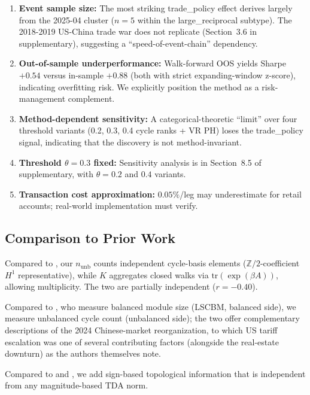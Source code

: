 \documentclass[11pt]{article}
\begin{document}
\begin{enumerate}
  \item \textbf{Event sample size:} The most striking trade\_policy effect
        derives largely from the 2025-04 cluster ($n = 5$ within the
        large\_reciprocal subtype). The 2018-2019 US-China trade war does not
        replicate (Section~3.6 in supplementary), suggesting a ``speed-of-event-chain''
        dependency.
  \item \textbf{Out-of-sample underperformance:} Walk-forward OOS yields Sharpe
        $+0.54$ versus in-sample $+0.88$ (both with strict expanding-window
        z-score), indicating overfitting risk. We explicitly position the
        method as a risk-management complement.
  \item \textbf{Method-dependent sensitivity:} A categorical-theoretic
        ``limit'' over four threshold variants (0.2, 0.3, 0.4 cycle ranks +
        VR PH) loses the trade\_policy signal, indicating that the discovery is
        not method-invariant.
  \item \textbf{Threshold $\theta = 0.3$ fixed:} Sensitivity analysis is in
        Section~8.5 of supplementary, with $\theta = 0.2$ and $0.4$ variants.
  \item \textbf{Transaction cost approximation:} $0.05\%$/leg may underestimate
        for retail accounts; real-world implementation must verify.
\end{enumerate}

\subsection{Comparison to Prior Work}

Compared to \citet{ferreira2021loss}, our $n_{\mathrm{unb}}$ counts independent
cycle-basis elements ($\mathbb{Z}/2$-coefficient $H^1$ representative), while
$K$ aggregates closed walks via $\mathrm{tr}(\exp(\beta A))$, allowing
multiplicity. The two are partially independent ($r = -0.40$).

Compared to \citet{wang2025core}, who measure balanced module size (LSCBM,
balanced side), we measure unbalanced cycle count (unbalanced side); the two
offer complementary descriptions of the 2024 Chinese-market reorganization, to
which US tariff escalation was one of several contributing factors (alongside the
real-estate downturn) as the authors themselves note.

Compared to \citet{gidea2017topological} and \citet{majumdar2024multi}, we add
sign-based topological information that is independent from any magnitude-based
TDA norm.
\end{document}
